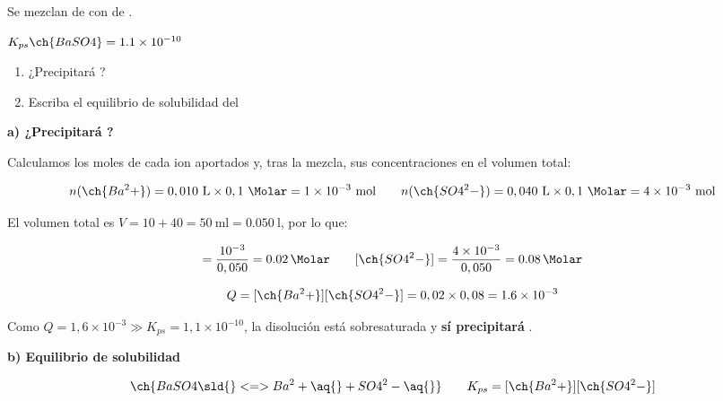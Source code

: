 \begin{exerciseEVAU}
    Se mezclan  de   con  de  .

    \datos{} \(K_{ps} \ch{BaSO4} = \num{1,1e-10}\)
    \begin{enumerate}[label=\letraminuscula]
\item ¿Precipitará ?
\item Escriba el equilibrio de solubilidad del 
    \end{enumerate}

    \begin{solu}

        \textbf{a) ¿Precipitará ?}

        Calculamos los moles de cada ion aportados y, tras la mezcla, sus concentraciones en el volumen total:

        \begin{equation*}
            n(\ch{Ba^2+}) = 0,010 \ \si{\litre} \times 0,1 \ \si{\Molar} = \num{1e-3} \ \text{mol} \qquad n(\ch{SO4^2-}) = 0,040 \ \si{\litre} \times 0,1 \ \si{\Molar} = \num{4e-3} \ \text{mol}
        \end{equation*}

        El volumen total es \(V = 10 + 40 = \SI{50}{\milli\litre} = \SI{0.050}{\litre}\), por lo que:

        \begin{equation*}
            [\ch{Ba^2+}] = \dfrac{10^{-3}}{0,050} = \SI{0.02}{\Molar} \qquad [\ch{SO4^2-}] = \dfrac{4 \times 10^{-3}}{0,050} = \SI{0.08}{\Molar}
        \end{equation*}

        \begin{equation*}
            Q = [\ch{Ba^2+}][\ch{SO4^2-}] = 0,02 \times 0,08 = \num{1.6e-3}
        \end{equation*}

        Como \(Q = 1,6 \times 10^{-3} \gg K_{ps} = 1,1 \times 10^{-10}\), la disolución está sobresaturada y \textbf{sí precipitará} .

        \textbf{b) Equilibrio de solubilidad}

        \begin{equation*}
            \ch{BaSO4 \sld{} <=> Ba^2+ \aq{} + SO4^2- \aq{}} \qquad K_{ps} = [\ch{Ba^2+}][\ch{SO4^2-}]
        \end{equation*}

    \end{solu}


\end{exerciseEVAU}

